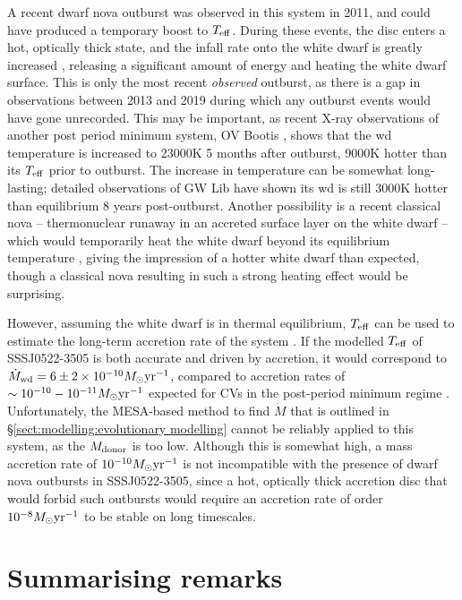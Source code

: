 A recent dwarf nova outburst was observed in this system in 2011, and could have produced a temporary boost to $T_{\rm eff}$. During these events, the disc enters a hot, optically thick state, and the infall rate onto the white dwarf is greatly increased \citep{osaki1996}, releasing a significant amount of energy and heating the white dwarf surface.
This is only the most recent \textit{observed} outburst, as there is a gap in observations between 2013 and 2019 during which any outburst events would have gone unrecorded. This may be important, as recent X-ray observations of another post period minimum system, OV Bootis \citep{Schwope2021}, shows that the wd temperature is increased to 23000K 5 months after outburst, 9000K hotter than its $T_{\rm eff}$ prior to outburst. The increase in temperature can be somewhat long-lasting; detailed observations of GW Lib have shown its wd is still 3000K hotter than equilibrium 8 years post-outburst\citep{Szkody2016}.
Another possibility is a recent classical nova -- thermonuclear runaway in an accreted surface layer on the white dwarf -- which would temporarily heat the white dwarf beyond its equilibrium temperature \citep{starrfield2016}, giving the impression of a hotter white dwarf than expected, though a classical nova resulting in such a strong heating effect would be surprising.

However, assuming the white dwarf is in thermal equilibrium, $T_{\rm eff}$ can be used to estimate the long-term accretion rate of the system \citep{townsley2009}.
If the modelled $T_{\rm eff}$ of SSSJ0522-3505 is both accurate and driven by accretion, it would correspond to $\dot M_{\rm wd} = 6\pm2 \times 10^{-10} M_\odot {\rm yr^{-1}}$, compared to accretion rates of $\sim10^{-10}-10^{-11} M_\odot {\rm yr^{-1}}$ expected for CVs in the post-period minimum regime \citep{Pala2017a}. Unfortunately, the MESA-based method to find $\dot M$ that is outlined in \S\ref{sect:modelling:evolutionary modelling} cannot be reliably applied to this system, as the $M_{\rm donor}$ is too low.
Although this is somewhat high, a mass accretion rate of $10^{-10} M_\odot {\rm yr^{-1}}$ is not incompatible with the presence of dwarf nova outbursts in SSSJ0522-3505, since a hot, optically thick accretion disc that would forbid such outbursts would require an accretion rate of order $10^{-8} M_\odot {\rm yr^{-1}}$ \citep{Hameury1998} to be stable on long timescales.


\section{Summarising remarks}

